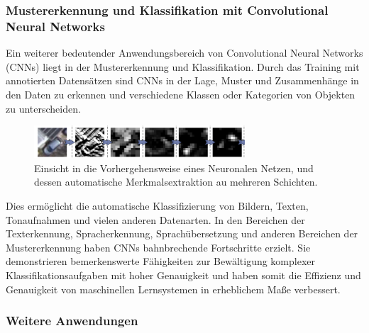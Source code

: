         \subsubsection{Mustererkennung und Klassifikation mit Convolutional Neural Networks}
    
            Ein weiterer bedeutender Anwendungsbereich von Convolutional Neural Networks (\acfp{CNN}) liegt in der Mustererkennung und Klassifikation. 
            Durch das Training mit annotierten Datensätzen sind \acp{CNN} in der Lage, Muster und Zusammenhänge in den Daten zu erkennen und verschiedene Klassen oder Kategorien von Objekten zu unterscheiden.

            \begin{figure}[h]
                \centering
                \includegraphics[width=0.7\textwidth]{img/feature_extraction.png}
                \caption{Einsicht in die Vorhergehensweise eines Neuronalen Netzen, und dessen automatische Merkmalsextraktion au mehreren Schichten.}
                \label{fig:feature_extraction}
            \end{figure}
            
            Dies ermöglicht die automatische Klassifizierung von Bildern, Texten, Tonaufnahmen und vielen anderen Datenarten. 
            In den Bereichen der Texterkennung, Spracherkennung, Sprachübersetzung und anderen Bereichen der Mustererkennung haben \acp{CNN} bahnbrechende Fortschritte erzielt. 
            Sie demonstrieren bemerkenswerte Fähigkeiten zur Bewältigung komplexer Klassifikationsaufgaben mit hoher Genauigkeit und haben somit die Effizienz und Genauigkeit von maschinellen Lernsystemen in erheblichem Maße verbessert.
            
        \subsubsection{Weitere Anwendungen}
    
